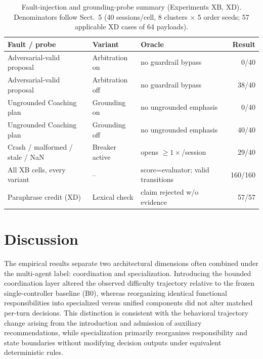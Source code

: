\documentclass[runningheads]{llncs}
\begin{document}
\begin{table}[t]
\caption{Fault-injection and grounding-probe summary (Experiments XB, XD). Denominators follow Sect.~5 (40 sessions/cell, 8 clusters $\times$ 5 order seeds; 57 applicable XD cases of 64 payloads).}
\label{tab:faultsummary}
\centering
\small
\begin{tabular}{@{}p{3.4cm}p{2.2cm}p{3.9cm}r@{}}
\toprule
Fault / probe & Variant & Oracle & Result \\
\midrule
Adversarial-valid proposal & Arbitration on  & no guardrail bypass & 0/40 \\
Adversarial-valid proposal & Arbitration off & no guardrail bypass & 38/40 \\
Ungrounded Coaching plan   & Grounding on    & no ungrounded emphasis & 0/40 \\
Ungrounded Coaching plan   & Grounding off   & no ungrounded emphasis & 40/40 \\
Crash / malformed / stale / NaN & Breaker active & opens $\geq 1\times$/session & 29/40 \\
All XB cells, every variant& --              & score=evaluator; valid transitions & 160/160 \\
Paraphrase credit (XD)     & Lexical check   & claim rejected w/o evidence & 57/57 \\
\bottomrule
\end{tabular}
\end{table}

\section{Discussion}

The empirical results separate two architectural dimensions often combined under the multi-agent label: coordination and specialization. Introducing the bounded coordination layer altered the observed difficulty trajectory relative to the frozen single-controller baseline (B0), whereas reorganizing identical functional responsibilities into specialized versus unified components did not alter matched per-turn decisions. This distinction is consistent with the behavioral trajectory change arising from the introduction and admission of auxiliary recommendations, while specialization primarily reorganizes responsibility and state boundaries without modifying decision outputs under equivalent deterministic rules.
\end{document}

